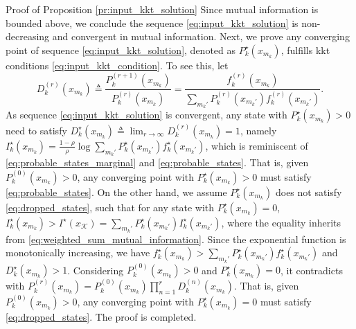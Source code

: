 \documentclass[journal,12pt,onecolumn,draftclsnofoot]{IEEEtran}
\theoremstyle{remark}
\begin{document}
\begin{appendix}
\begin{subsection}{Proof of Proposition \ref{pr:input_kkt_solution}}
		Since mutual information is bounded above, we conclude the sequence \eqref{eq:input_kkt_solution} is non-decreasing and convergent in mutual information.
		Next, we prove any converging point of sequence \eqref{eq:input_kkt_solution}, denoted as $P_k^\star(x_{m_k})$, fulfills \gls{kkt} conditions \eqref{eq:input_kkt_condition}.
		To see this, let
		\begin{equation}
			D_k^{(r)}(x_{m_k}) \triangleq \frac{P_k^{(r+1)}(x_{m_k})}{P_k^{(r)}(x_{m_k})} = \frac{f_k^{(r)}(x_{m_k})}{\sum_{m_k'} P_k^{(r)}(x_{m_k'}) f_k^{(r)}(x_{m_k'})}.
		\end{equation}
		As sequence \eqref{eq:input_kkt_solution} is convergent, any state with $P_k^\star(x_{m_k}) > 0$ need to satisfy $D_k^\star(x_{m_k}) \triangleq \lim_{r \to \infty} D_k^{(r)}(x_{m_k}) = 1$, namely $I_k^\star(x_{m_k}) = \frac{1 - \rho}{\rho} \log \sum_{m_k'} P_k^\star(x_{m_k'}) f_k^\star(x_{m_k'})$, which is reminiscent of \eqref{eq:probable_states_marginal} and \eqref{eq:probable_states}.
		That is, given $P_k^{(0)}(x_{m_k}) > 0$, any converging point with $P_k^\star(x_{m_k}) > 0$ must satisfy \eqref{eq:probable_states}.
		On the other hand, we assume $P_k^\star(x_{m_k})$ does not satisfy \eqref{eq:dropped_states}, such that for any state with $P_k^\star(x_{m_k}) = 0$, $I_k^\star(x_{m_k}) > I^\star(x_{\mathcal{K}}) = \sum_{m_k'} P_k^\star(x_{m_k'}) I_k^\star(x_{m_k'})$, where the equality inherits from \eqref{eq:weighted_sum_mutual_information}.
		Since the exponential function is monotonically increasing, we have $f_k^\star(x_{m_k}) > \sum_{m_k'} P_k^\star(x_{m_k'}) f_k^\star(x_{m_k'})$ and $D_k^\star(x_{m_k}) > 1$.
		Considering $P_k^{(0)}(x_{m_k}) > 0$ and $P_k^\star(x_{m_k}) = 0$, it contradicts with $P_k^{(r)}(x_{m_k}) = P_k^{(0)}(x_{m_k}) \prod_{n=1}^r D_k^{(n)}(x_{m_k})$.
		That is, given $P_k^{(0)}(x_{m_k}) > 0$, any converging point with $P_k^\star(x_{m_k}) = 0$ must satisfy \eqref{eq:dropped_states}.
		The proof is completed.
		\label{ap:input_kkt_solution}
	\end{subsection}
\end{appendix}




\end{document}
